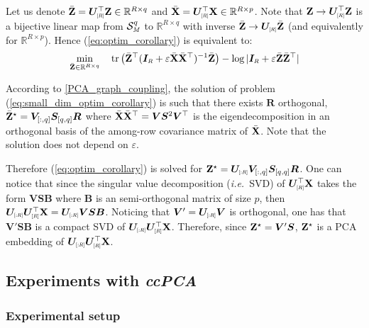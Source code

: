 Let us denote $\bar{\Z} = \bm{U}_{\scaleto{[R]}{5pt}}^\top\Z \in \mathbb{R}^{R \times q}$ and $\bar{\X} = \bm{U}_{\scaleto{[R]}{5pt}}^\top\X \in \mathbb{R}^{R \times p}$. Note that $\Z \to \bm{U}_{\scaleto{[R]}{5pt}}^\top\Z$ is a bijective linear map from $\mathcal{S}^q_{\scaleto{M}{4pt}}$ to $\mathbb{R}^{R \times q}$ with inverse $\bar{\Z} \to \bm{U}_{\scaleto{[R]}{5pt}}\bar{\Z}$ (and equivalently for $\mathbb{R}^{R \times p}$). Hence (\ref{eq:optim_corollary}) is equivalent to:
\begin{align}\label{eq:small_dim_optim_corollary}
    \min_{\bar{\Z} \in \mathbb{R}^{R \times q}} \quad \operatorname{tr}\left(\bar{\Z}^\top(\bm{I}_{\scaleto{R}{4pt}} +  \varepsilon \bar{\X}\bar{\X}^\top)^{-1}\bar{\Z}\right) - \log |\bm{I}_{\scaleto{R}{4pt}}  +  \varepsilon \bar{\Z}\bar{\Z}^\top| 
\end{align}

According to \cref{PCA_graph_coupling}, the solution of problem (\ref{eq:small_dim_optim_corollary}) is such that there exists $\bm{R}$ orthogonal, $\bar{\mathbf{Z}}^\star = \bm{V}_{[:,q]} \bm{S}_{[q,q]} \bm{R}$ where $\bar{\mathbf{X}}\bar{\mathbf{X}}^\top = \bm{V} \bm{S}^2 \bm{V}^\top$ is the eigendecomposition in an orthogonal basis of the among-row covariance matrix of $\bar{\mathbf{X}}$. Note that the solution does not depend on $\varepsilon$.

Therefore (\ref{eq:optim_corollary}) is solved for $\Z^\star = \bm{U}_{\scaleto{[:R]}{5pt}}\bm{V}_{[:,q]} \bm{S}_{[q,q]} \bm{R}$. One can notice that since the singular value decomposition (\textit{i.e.}\ SVD) of $\bm{U}_{\scaleto{[R]}{5pt}}^\top\X$ takes the form $\bm{V}\bm{S}\bm{B}$ where $\bm{B}$ is an semi-orthogonal matrix of size $p$, then $\bm{U}_{\scaleto{[:R]}{5pt}}\bm{U}_{\scaleto{[R]}{5pt}}^\top\X = \bm{U}_{\scaleto{[:R]}{5pt}}\bm{V}\bm{S}\bm{B}$. Noticing that $\bm{V}' = \bm{U}_{\scaleto{[:R]}{5pt}}\bm{V}$ is orthogonal, one has that $\bm{V}' \bm{S}\bm{B}$ is a compact SVD of $\bm{U}_{\scaleto{[:R]}{5pt}}\bm{U}_{\scaleto{[R]}{5pt}}^\top\X$. Therefore, since $\mathbf{Z}^\star = \bm{V}' \bm{S}$, $\mathbf{Z}^\star$ is a PCA embedding of $\bm{U}_{\scaleto{[:R]}{5pt}}\bm{U}_{\scaleto{[R]}{5pt}}^\top\X$.


\subsection{Experiments with \textit{ccPCA}}\label{sec:cc_pca_exps}

\subsubsection{Experimental setup}\label{sec:setup_ccpca}

